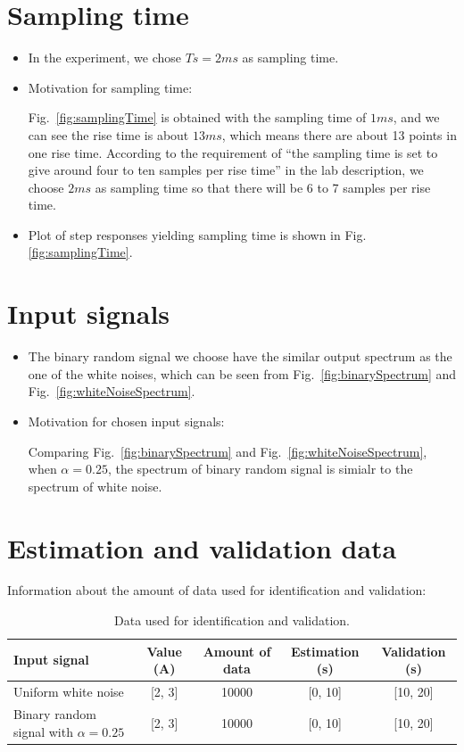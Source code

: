 \documentclass[10pt,a4paper]{article}
\begin{document}
\section{Sampling time}
\begin{itemize}
    \item In the experiment, we chose $Ts = 2ms$ as sampling time.
    \item Motivation for sampling time:
    \par Fig.~\ref{fig:samplingTime} is obtained with the sampling time of $1ms$, and we can see the rise time is about $13ms$, which means there are about 13 points in one rise time. According to the requirement of ``the sampling time is set to give around four to ten samples per rise time'' in the lab description, we choose $2ms$ as sampling time so that there will be 6 to 7 samples per rise time.
    \item Plot of step responses yielding sampling time is shown in Fig.\ref{fig:samplingTime}.
\end{itemize}

\section{Input signals}
\begin{itemize}
    \item The binary random signal we choose have the similar output spectrum as the one of the white noises, which can be seen from Fig.~\ref{fig:binarySpectrum} and Fig.~\ref{fig:whiteNoiseSpectrum}.
    \item Motivation for chosen input signals:
    \par Comparing Fig.~\ref{fig:binarySpectrum} and Fig.~\ref{fig:whiteNoiseSpectrum}, when $\alpha=0.25$, the spectrum of binary random signal is simialr to the spectrum of white noise.
\end{itemize}

\section{Estimation and validation data}
\par Information about the amount of data used for identification and validation:
    \begin{table}[ht]
	    \footnotesize
    	\centering
    	\caption{Data used for identification and validation.}
    	\label{table:data}
    	\begin{tabular}{lcccc}
    	\hline
    	Input signal & Value (A) & Amount of data & Estimation (s) & Validation (s) \\
    	\hline
    	Uniform white noise & [2, 3] & 10000 & [0, 10] & [10, 20] \\
    	Binary random signal with $\alpha = 0.25$ & [2, 3] & 10000 & [0, 10] & [10, 20] \\
    	\hline
    	\end{tabular}
    \end{table}
\end{document}
